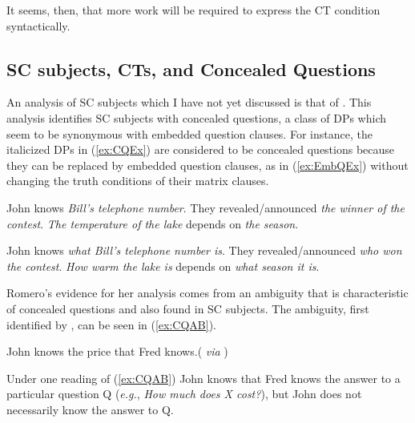 \documentclass[
	letterpaper,
]{article}
\begin{document}
It seems, then, that more work will be required to express the CT condition syntactically.


%
%
\subsection{SC subjects, CTs, and Concealed Questions}
An analysis of SC subjects which I have not yet discussed is that of \textcite{romero2005concealed}.
This analysis identifies SC subjects with concealed questions, a class of DPs which seem to be synonymous with embedded question clauses.
For instance, the italicized DPs in (\ref{ex:CQEx}) are considered to be concealed questions because they can be replaced by embedded question clauses, as in (\ref{ex:EmbQEx}) without changing the truth conditions of their matrix clauses.
\begin{exe}
	\ex\label{ex:CQEx}
	\begin{xlist}
		\ex John knows \textit{Bill’s telephone number}.
		\ex They revealed/announced \textit{the winner of the contest}.
		\ex \textit{The temperature of the lake} depends on \textit{the season}.
	\end{xlist}
	\ex\label{ex:EmbQEx}
	\begin{xlist}
		\ex John knows \textit{what Bill’s telephone number is}.
		\ex They revealed/announced \textit{who won the contest}.
		\ex \textit{How warm the lake is} depends on \textit{what season it is}.\hfill\parencite[687]{romero2005concealed}
	\end{xlist}	
\end{exe}
Romero's evidence for her analysis comes from an ambiguity that is characteristic of concealed questions and also found in SC subjects.
The ambiguity, first identified by \textcite{heim1979concealed}, can be seen in (\ref{ex:CQAB}).
\begin{exe}
	\ex\label{ex:CQAB} John knows the price that Fred knows.\hfill(\cite{heim1979concealed} \textit{via} \cite{romero2005concealed})
\end{exe}
Under one reading of (\ref{ex:CQAB}) John knows that Fred knows the answer to a particular question Q (\textit{e.g.}, \textit{How much does X cost?}), but John does not necessarily know the answer to Q.
\end{document}

